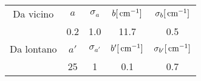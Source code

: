\begin{tabulary}{\textwidth}{CCCCC}
\toprule
Da vicino & $a$ & $\sigma_a$ & $b [\,\mathrm{cm}^{-1}]$ & $\sigma_b [\,\mathrm{cm}^{-1}]$ \\ 
 & 0.2 & 1.0 & 11.7 & 0.5 \\ \midrule
Da lontano & $a'$ & $\sigma_{a'}$ & $b' [\,\mathrm{cm}^{-1}]$ & $\sigma_{b'} [\,\mathrm{cm}^{-1}]$ \\ 
 & 25 & 1 & 0.1 & 0.7 \\
\bottomrule
\end{tabulary}
